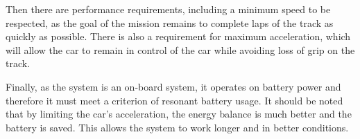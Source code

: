 Then there are performance requirements, including a minimum speed to be respected, as the goal of the mission remains to complete laps of the track as quickly as possible. There is also a requirement for maximum acceleration, which will allow the car to remain in control of the car while avoiding loss of grip on the track.

Finally, as the system is an on-board system, it operates on battery power and therefore it must meet a criterion of resonant battery usage. It should be noted that by limiting the car's acceleration, the energy balance is much better and the battery is saved. This allows the system to work longer and in better conditions.

\newpage